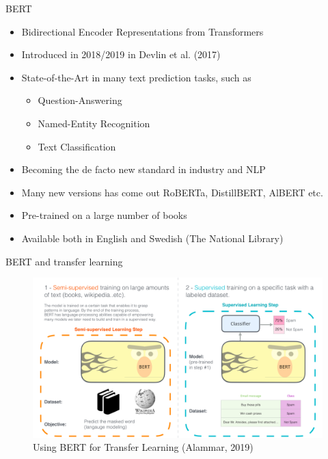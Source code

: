 \documentclass[10pt]{beamer}
\begin{document}
\begin{frame}{BERT}

\begin{itemize}
\item Bidirectional Encoder Representations from Transformers
\item Introduced in 2018/2019 in Devlin et al. (2017)
\pause
\item {\color{uured} State-of-the-Art} in many text prediction tasks, such as
\begin{itemize}
\item Question-Answering
\item Named-Entity Recognition
\item Text Classification
\end{itemize}
\pause
\item Becoming the de facto new standard in industry and NLP
\pause
\item Many new versions has come out RoBERTa, DistillBERT, AlBERT etc.
\pause
\item {\color{uured} Pre-trained} on a large number of books
\pause
\item Available both in English and Swedish (The National Library)
\end{itemize}

\end{frame}


\begin{frame}{BERT and transfer learning}

\begin{figure}[h]
\centering
\includegraphics[width=1\textwidth]{fig/bert-transfer-learning.png}
\caption{Using BERT for Transfer Learning (Alammar, 2019)}
\end{figure}

\end{frame}
\end{document}
